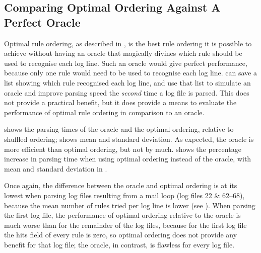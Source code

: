 
\FloatBarrier{}

\subsection{Comparing Optimal Ordering Against A Perfect Oracle}

\label{perfect rule ordering}

Optimal rule ordering, as described in , is the best rule ordering it is possible to achieve without
having an oracle that magically divines which rule should be used to
recognise each log line.  Such an oracle would give perfect performance,
because only one rule would need to be used to recognise each log line.
\parsername{} can save a list showing which rule recognised each log line,
and use that list to simulate an oracle and improve parsing speed the
\textit{second\/} time a log file is parsed.  This does not provide a
practical benefit, but it does provide a means to evaluate the performance
of optimal rule ordering in comparison to an oracle.

 shows the parsing times of the oracle and the optimal
ordering, relative to shuffled ordering;  shows mean and
standard deviation.  As expected, the oracle is more efficient than optimal
ordering, but not by much.   shows the percentage
increase in parsing time when using optimal ordering instead of the oracle,
with mean and standard deviation in .

Once again, the difference between the oracle and optimal ordering is at
its lowest when parsing log files resulting from a mail loop (log files 22
\& 62--68), because the mean number of rules tried per log line is lower
(see ).  When parsing the
first log file, the performance of optimal ordering relative to the oracle
is much worse than for the remainder of the log files, because for the
first log file the hits field of every rule is zero, so optimal ordering
does not provide any benefit for that log file; the oracle, in contrast, is
flawless for every log file.

